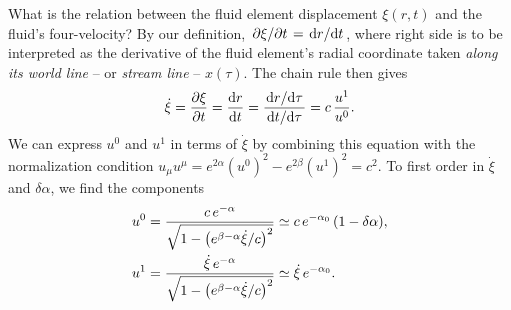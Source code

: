 What is the relation between the fluid element displacement $\xi(r,t)$ and the fluid's four-velocity?
By our definition, $\pdv{\xi}/{t} = \odv{r}/{t}$, where right side is to be interpreted as the derivative of the fluid element's radial coordinate taken \emph{along its world line} -- or \emph{stream line} -- $x(\tau)$.
The chain rule then gives
\begin{equation}
	\dot\xi = \pdv{\xi}{t} = \odv{r}{t} = \frac{\odv{r}/{\tau}}{\odv{t}/{\tau}} = c \, \frac{u^1}{u^0} .
\end{equation}
We can express $u^0$ and $u^1$ in terms of $\dot\xi$ by combining this equation with the normalization condition $u_\mu u^\mu = e^{2 \alpha} \left( u^0 \right)^2 - e^{2 \beta} \left( u^1 \right)^2 = c^2$.
To first order in $\dot\xi$ and $\delta \alpha$, we find the components
\begin{subequations}
\begin{align}
	u^0 &= \frac{c \, e^{-\alpha}}{\sqrt{1 - \left( e^{\beta-\alpha} \dot\xi / c \right)^2 }} \simeq c \, e^{-\alpha_0} \, (1 - \delta \alpha), \\
	u^1 &= \frac{\dot\xi \, e^{-\alpha}}{\sqrt{1 - \left( e^{\beta-\alpha} \dot\xi / c \right)^2 }} \simeq \dot\xi \, e^{-\alpha_0} .
\end{align}
\label{eq:nstars:velocity_components}
\end{subequations}

